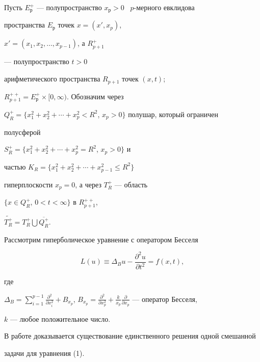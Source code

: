 Пусть $E_{р}^{+}$ --- полупространство $x_{р}>0$ \ $p$-мерного евклидова 


пространства $E_{р}$ точек $x=(x',x_{p})$, 


$x'=(x_{1},x_{2},\dotsc,x_{p-1})$, а $R_{p+1}^{+}$


--- полупространство  $t>0$ 


арифметического пространства $R_{p+1}$ точек $(x,t)$; 


$R_{p+1}^{++}=E_{р}^{+}\times [0,\infty)$. Обозначим через 


$Q_R^+=\{x_1^2+x_2^2+\dotsb+x_p^2<R^2$, $x_p>0\}$ полушар, который ограничен 


полусферой


$S_{R}^{+}=\{x_{1}^{2}+x_{2}^{2}+\dotsb+x_{p}^{2}=R^{2}$, $x_p>0\}$ и 


частью $K_{R}=\{x_{1}^{2}+x_{2}^{2}+\dotsb+x_{p-1}^{2}\leq R^{2}\}$ 


гиперплоскости $x_p=0$, а через $T^{+}_{R}$ --- область 


$\{ x\in Q^{+}_{R}$,  $0<t<\infty \}$ в $R^{++}_{p+1}$, 


$\widetilde{T^+_R}=T^+_R\bigcup\overline{Q^+_R}$.





Рассмотрим гиперболическое уравнение с оператором Бесселя


\begin{equation}


L(u)\equiv \Delta_{B}u-\frac{\partial ^2 u}{\partial t^2}=f(x,t),


\end{equation}


где


$\Delta_{B}=\sum \limits _{i=1}^{p-1} \frac{\partial^{2}}{\partial{x_{i}^


{2}}}+B_{x_{p}}$, $B_{x_{p}}=\frac{\partial^{2}}{\partial{x_{p}^{2}}}+\frac{k}


{x_{p}}\frac{\partial}{\partial{x_{p}}}$ --- оператор Бесселя, 


$k$ --- любое положительное число.





В работе доказывается существование единственного решения одной смешанной 


задачи для уравнения (1).


\smallskip





